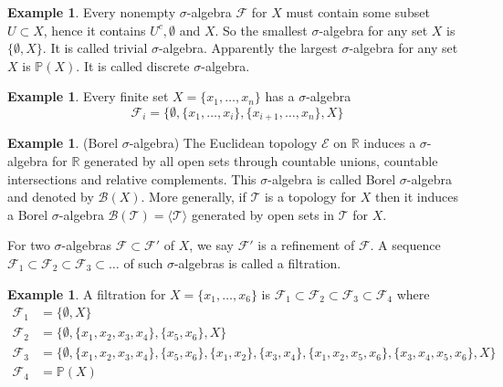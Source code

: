 \documentclass[12pt]{amsart}
\theoremstyle{definition}
\newtheorem{example}[theorem]{Example}
\begin{document}
\begin{example} Every nonempty $\sigma$-algebra $\mathcal{F}$ for $X$ must contain some subset $U \subset X$, hence it contains $U^c, \emptyset$ and $X$. So the smallest $\sigma$-algebra for any set $X$ is $\{\emptyset, X\}$. It is called trivial $\sigma$-algebra. Apparently the largest $\sigma$-algebra for any set $X$ is $\mathbb{P}(X)$. It is called discrete $\sigma$-algebra.
\end{example}

\begin{example} Every finite set $X = \{x_1, \dots , x_n\}$ has a $\sigma$-algebra
$$\mathcal{F}_i = \{\emptyset, \{x_1, \dots , x_i\}, \{x_{i+1}, \dots , x_n\}, X\}$$
\end{example}

\begin{example} (Borel $\sigma$-algebra) The Euclidean topology $\mathcal{E}$ on $\mathbb{R}$ induces a $\sigma$-algebra for $\mathbb{R}$ generated by all open sets through countable unions, countable intersections and relative complements. This $\sigma$-algebra is called Borel $\sigma$-algebra and denoted by $\mathcal{B}(X)$. More generally, if $\mathcal{T}$ is a topology for $X$ then it induces a Borel $\sigma$-algebra $\mathcal{B}(\mathcal{T}) = \langle \mathcal{T} \rangle$ generated by open sets in $\mathcal{T}$ for $X$.
\end{example}

\dfn\label{refinement_filtration} For two $\sigma$-algebras $\mathcal{F} \subset \mathcal{F}'$ of $X$, we say $\mathcal{F}'$ is a refinement of $\mathcal{F}$. A sequence $\mathcal{F}_1 \subset \mathcal{F}_2 \subset \mathcal{F}_3 \subset \dots$ of such $\sigma$-algebras is called a filtration.

\begin{example} \label{filtration_example} A filtration for $X = \{x_1, \dots ,x_6\}$ is $\mathcal{F}_1 \subset \mathcal{F}_2 \subset \mathcal{F}_3 \subset \mathcal{F}_4$ where
\begin{align*}
\mathcal{F}_1 & = \{\emptyset, X\} \\
\mathcal{F}_2 & = \{\emptyset, \{x_1,x_2,x_3,x_4\}, \{x_5, x_6\}, X\} \\
\mathcal{F}_3 & = \{ \emptyset, \{x_1, x_2, x_3, x_4\}, \{x_5, x_6\}, \{x_1, x_2\}, \{x_3, x_4\}, \{x_1, x_2, x_5, x_6\}, \{x_3, x_4, x_5, x_6\}, X\} \\
\mathcal{F}_4 & = \mathbb{P}(X)
\end{align*}
\end{example}
\end{document}
